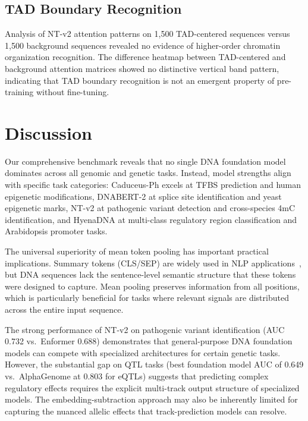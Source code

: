 \documentclass[11pt]{article}
\begin{document}
\subsection{TAD Boundary Recognition}

Analysis of NT-v2 attention patterns on 1,500 TAD-centered sequences versus 1,500 background sequences revealed no evidence of higher-order chromatin organization recognition.  The difference heatmap between TAD-centered and background attention matrices showed no distinctive vertical band pattern, indicating that TAD boundary recognition is not an emergent property of pre-training without fine-tuning.

\section{Discussion}

Our comprehensive benchmark reveals that no single DNA foundation model dominates across all genomic and genetic tasks.  Instead, model strengths align with specific task categories: Caduceus-Ph excels at TFBS prediction and human epigenetic modifications, DNABERT-2 at splice site identification and yeast epigenetic marks, NT-v2 at pathogenic variant detection and cross-species 4mC identification, and HyenaDNA at multi-class regulatory region classification and Arabidopsis promoter tasks.

The universal superiority of mean token pooling has important practical implications.  Summary tokens (CLS/SEP) are widely used in NLP applications~\citep{devlin2019bert}, but DNA sequences lack the sentence-level semantic structure that these tokens were designed to capture.  Mean pooling preserves information from all positions, which is particularly beneficial for tasks where relevant signals are distributed across the entire input sequence.

The strong performance of NT-v2 on pathogenic variant identification (AUC 0.732 vs.\ Enformer 0.688) demonstrates that general-purpose DNA foundation models can compete with specialized architectures for certain genetic tasks.  However, the substantial gap on QTL tasks (best foundation model AUC of 0.649 vs.\ AlphaGenome at 0.803 for eQTLs) suggests that predicting complex regulatory effects requires the explicit multi-track output structure of specialized models.  The embedding-subtraction approach may also be inherently limited for capturing the nuanced allelic effects that track-prediction models can resolve.
\end{document}
